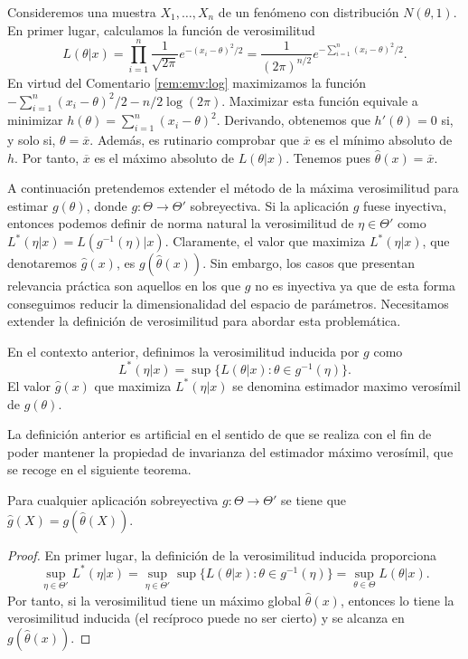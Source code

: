 \documentclass{article}
\begin{document}
    \begin{ex}
        Consideremos una muestra $X_1, \ldots, X_n$ de un fenómeno con distribución $N(\theta,1)$. En primer lugar, calculamos la función de verosimilitud
        \[L(\theta | x) = \prod_{i = 1}^n \frac{1}{\sqrt{2\pi}} e^{-(x_i - \theta)^2 / 2} = \frac{1}{(2\pi)^{n/2}}e^{-\sum_{i = 1}^n (x_i - \theta)^2 / 2}.\]
        En virtud del Comentario \ref{rem:emv:log} maximizamos la función $-\sum_{i = 1}^n (x_i - \theta)^2 / 2 - n/2 \log(2\pi)$. Maximizar esta función equivale a minimizar $h(\theta) = \sum_{i = 1}^n (x_i - \theta)^2$. Derivando, obtenemos que $h'(\theta) = 0$ si, y solo si, $\theta = \overline{x}$. Además, es rutinario comprobar que $\overline{x}$ es el mínimo absoluto de $h$. Por tanto, $\overline{x}$ es el máximo absoluto de $L(\theta | x)$. Tenemos pues $\hat{\theta}(x) = \overline{x}$.
    \end{ex}

    A continuación pretendemos extender el método de la máxima verosimilitud para estimar $g(\theta)$, donde $g : \Theta \to \Theta'$ sobreyectiva. Si la aplicación $g$ fuese inyectiva, entonces podemos definir de norma natural la verosimilitud de $\eta \in \Theta'$ como $L^*(\eta | x) = L(g^{-1}(\eta) | x)$. Claramente, el valor que maximiza $L^*(\eta | x)$, que denotaremos $\hat{g}(x)$, es $g(\hat{\theta}(x))$. Sin embargo, los casos que presentan relevancia práctica son aquellos en los que $g$ no es inyectiva ya que de esta forma conseguimos reducir la dimensionalidad del espacio de parámetros. Necesitamos extender la definición de verosimilitud para abordar esta problemática.

    \begin{definition}
        En el contexto anterior, definimos la verosimilitud inducida por $g$ como
        \[L^*(\eta|x) = \sup\{L(\theta | x): \theta \in g^{-1}(\eta)\}.\]
        El valor $\hat{g}(x)$ que maximiza $L^*(\eta|x)$ se denomina estimador maximo verosímil de $g(\theta)$.
    \end{definition}

    La definición anterior es artificial en el sentido de que se realiza con el fin de poder mantener la propiedad de invarianza del estimador máximo verosímil, que se recoge en el siguiente teorema.

    \begin{thm}
        Para cualquier aplicación sobreyectiva $g: \Theta \to \Theta'$ se tiene que $\hat{g}(X) = g(\hat{\theta}(X))$.
    \end{thm}
    \begin{proof}
        En primer lugar, la definición de la verosimilitud inducida proporciona
        \[\sup_{\eta \in \Theta'} L^*(\eta|x) = \sup_{\eta \in \Theta'} \sup\{L(\theta | x): \theta \in g^{-1}(\eta)\} = \sup_{\theta \in \Theta} L(\theta | x).\]
        Por tanto, si la verosimilitud tiene un máximo global $\hat\theta(x)$, entonces lo tiene la verosimilitud inducida (el recíproco puede no ser cierto) y se alcanza en $g(\hat\theta(x))$.
    \end{proof}
\end{document}
